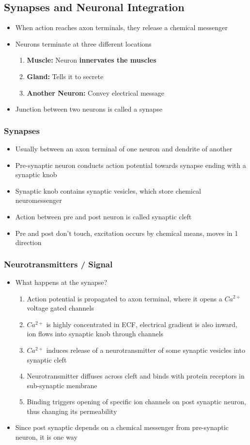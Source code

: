 \documentclass[11pt]{article}
\begin{document}
\subsection{Synapses and Neuronal Integration}
\begin{itemize}
\item When action reaches axon terminals, they release a chemical messenger
\item Neurons terminate at three different locations 
\begin{enumerate}
\item \textbf{Muscle:} Neuron \textbf{innervates the muscles}
\item \textbf{Gland: }Tells it to secrete
\item\textbf{Another Neuron: }Convey electrical message
\end{enumerate}
\item Junction between two neurons is called a synapse
\end{itemize}
\subsubsection{Synapses}
\begin{itemize}
\item Usually between an axon terminal of one neuron and dendrite of another
\item Pre-synaptic neuron conducts action potential towards synapse ending with a synaptic knob 
\item Synaptic knob contains synaptic vesicles, which store chemical neuromessenger
\item Action between pre and post neuron is called synaptic cleft
\item Pre and post don't touch, excitation occurs by chemical means, moves in 1 direction 
\end{itemize}
\subsubsection{Neurotransmitters / Signal}
\begin{itemize}
\item What happens at the synapse?
\begin{enumerate}
\item Action potential is propagated to axon terminal, where it opens a $Ca^{2+}$ voltage gated channels 
\item $Ca^{2+}$ is highly concentrated in ECF, electrical gradient is also inward, ion flows into synaptic knob through channels
\item  $Ca^{2+}$ induces release of a neurotransmitter of some synaptic vesicles into synaptic cleft 
\item Neurotransmitter diffuses across cleft and binds with protein receptors in sub-synaptic membrane
\item Binding triggers opening of specific ion channels on post synaptic neuron, thus changing its permeability
\end{enumerate}
\item Since post synaptic depends on a chemical messenger from pre-synaptic neuron, it is one way
\end{itemize}
\end{document}
